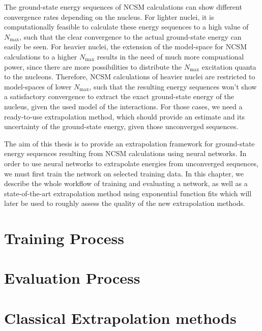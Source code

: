 The ground-state energy sequences of NCSM calculations can show different convergence rates depending on the nucleus. For lighter nuclei, it is computationally feasible to calculate these energy sequences to a high value of $N_\mathrm{max}$, such that the clear convergence to the actual ground-state energy can easily be seen. For heavier nuclei, the extension of the model-space for NCSM calculations to a higher $N_\mathrm{max}$ results in the need of much more compuational power, since there are more possibilities to distribute the $N_\mathrm{max}$ excitation quanta to the nucleons. Therefore, NCSM calculations of heavier nuclei are restricted to model-spaces of lower $N_\mathrm{max}$, such that the resulting energy sequences won't show a satisfactory convergence to extract the exact ground-state energy of the nucleus, given the used model of the interactions. For those cases, we need a ready-to-use extrapolation method, which should provide an estimate and its uncertainty of the ground-state energy, given those unconverged sequences.

The aim of this thesis is to provide an extrapolation framework for ground-state energy sequences resulting from NCSM calculations using neural networks. In order to use neural networks to extrapolate energies from unconverged sequences, we must first train the network on selected training data. In this chapter, we describe the whole workflow of training and evaluating a network, as well as a state-of-the-art extrapolation method using exponential function fits which will later be used to roughly assess the quality of the new extrapolation methods.

\section{Training Process}

\section{Evaluation Process}

\section{Classical Extrapolation methods}
\label{sec:classical_extrapolation}

